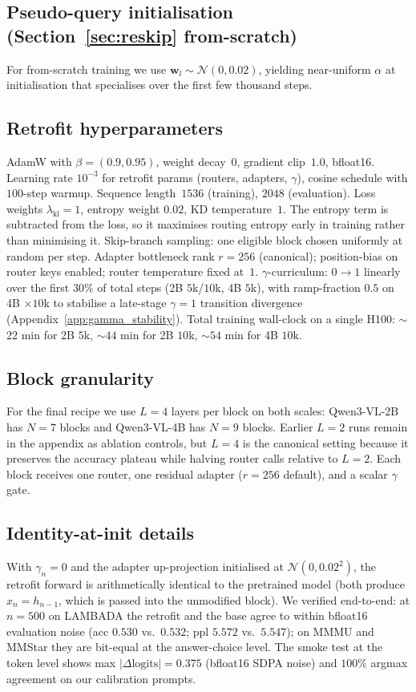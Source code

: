 \documentclass{article}
\begin{document}
\subsection{Pseudo-query initialisation (Section~\ref{sec:reskip} from-scratch)}
For from-scratch training we use $\mathbf{w}_l \sim \mathcal{N}(0, 0.02)$, yielding near-uniform $\alpha$ at initialisation that specialises over the first few thousand steps.

\subsection{Retrofit hyperparameters}
\label{app:retrofit_hparams}
AdamW with $\beta{=}(0.9,0.95)$, weight decay~$0$, gradient clip~$1.0$, bfloat16. Learning rate $10^{-3}$ for retrofit params (routers, adapters, $\gamma$), cosine schedule with $100$-step warmup. Sequence length~$1536$ (training), $2048$ (evaluation). Loss weights $\lambda_{\text{kl}}{=}1$, entropy weight $0.02$, KD temperature~$1$. The entropy term is subtracted from the loss, so it maximises routing entropy early in training rather than minimising it. Skip-branch sampling: one eligible block chosen uniformly at random per step. Adapter bottleneck rank $r{=}256$ (canonical); position-bias on router keys enabled; router temperature fixed at~$1$. $\gamma$-curriculum: $0\to 1$ linearly over the first $30\%$ of total steps (2B $5$k/$10$k, 4B $5$k), with ramp-fraction $0.5$ on 4B $\times 10$k to stabilise a late-stage $\gamma{=}1$ transition divergence (Appendix~\ref{app:gamma_stability}). Total training wall-clock on a single H100: $\sim$$22$ min for 2B $5$k, $\sim$$44$ min for 2B $10$k, $\sim$$54$ min for 4B $10$k.

\subsection{Block granularity}
\label{app:block_granularity}
For the final recipe we use $L{=}4$ layers per block on both scales: Qwen3-VL-2B has $N{=}7$ blocks and Qwen3-VL-4B has $N{=}9$ blocks. Earlier $L{=}2$ runs remain in the appendix as ablation controls, but $L{=}4$ is the canonical setting because it preserves the accuracy plateau while halving router calls relative to $L{=}2$. Each block receives one router, one residual adapter ($r{=}256$ default), and a scalar $\gamma$ gate.

\subsection{Identity-at-init details}
\label{app:identity}
With $\gamma_n{=}0$ and the adapter up-projection initialised at $\mathcal{N}(0, 0.02^2)$, the retrofit forward is arithmetically identical to the pretrained model (both produce $x_n = h_{n-1}$, which is passed into the unmodified block). We verified end-to-end: at $n{=}500$ on LAMBADA the retrofit and the base agree to within bfloat16 evaluation noise (acc $0.530$ vs.\ $0.532$; ppl $5.572$ vs.\ $5.547$); on MMMU and MMStar they are bit-equal at the answer-choice level. The smoke test at the token level shows max $|\Delta\text{logits}| = 0.375$ (bfloat16 SDPA noise) and $100\%$ argmax agreement on our calibration prompts.
\end{document}
